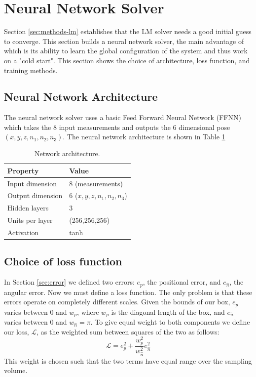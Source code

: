 \section{Neural Network Solver}\label{sec:network}
Section \ref{sec:methods-lm} establishes that the LM solver needs a good initial guess to converge. This section builds a neural network solver, the main advantage of which is its ability to learn the global configuration of the system and thus work on a "cold start". This section shows the choice of architecture, loss function, and training methods.
\subsection{Neural Network Architecture}
The neural network solver uses a basic Feed Forward Neural Network (FFNN) which takes the 8 input measurements and outputs the 6 dimensional pose $(x,y,z,n_1,n_2,n_3)$. The neural network architecture is shown in Table \ref{tab:architecture} 

\begin{table}
  \centering
  \begin{tabular}{ll}
    \toprule
    Property & Value \\
    \midrule
    Input dimension       & 8 (measurements) \\
    Output dimension      & 6 ($x, y, z, n_1, n_2, n_3$) \\
    Hidden layers         & 3 \\
    Units per layer       & (256,256,256) \\
    Activation            & tanh \\
    \bottomrule
  \end{tabular}
  \caption{Network architecture.}
  \label{tab:architecture}
\end{table}
\subsection{Choice of loss function}\label{sec:methods-loss}
In Section \ref{sec:error} we defined two errors: $e_p$, the positional error, and $e_{\hat{n}}$, the angular error. Now we must define a loss function. The only problem is that these errors operate on completely different scales. Given the bounds of our box, $e_p$ varies between $0$ and $w_p$, where $w_p$ is the diagonal length of the box, and $e_{\hat{n}}$ varies between $0$ and $w_{\hat{n}} = \pi$. To give equal weight to both components we define our loss, $\mathcal{L}$, as the weighted sum between squares of the two as follows: 
\begin{equation}
  \mathcal{L} = e_p^2 + \frac{w_p^2}{w_{\hat{n}}^2} e_{\hat{n}}^2
  \label{eq:loss}
\end{equation}
This weight is chosen such that the two terms have equal range over the sampling volume.
